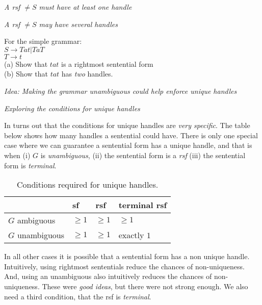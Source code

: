 

\frmrule 

\textit{A rsf $\neq S$ must have at least one handle}




\frmrule 

\textit{A rsf $\neq S$ may have several handles}


\begin{example}
For the simple grammar:\\
$S \rightarrow Tat | TaT$\\
$T \rightarrow t$\\
(a) Show that $tat$ is a rightmost sentential form\\
(b) Show that $tat$ has \textit{two} handles.
\end{example}



\frmrule 

\textit{Idea: Making the grammar unambiguous could help enforce unique handles}

\frmrule 


\textit{Exploring the conditions for unique handles}

In turns out that the conditions for unique handles are \textit{very specific}. 
The table below shows how many handles a sentential could have. There is 
only one special case where we can guarantee a sentential form has a unique
handle, and that is when (i) $G$ is \textit{unambiguous}, 
(ii) the sentential form is a \textit{rsf} (iii) the sentential form is \textit{terminal}.

\begin{table}[h]
    \centering
    \begin{tabular}{l|lll}
                        & sf & rsf  & terminal rsf\\ \hline
    $G$ ambiguous       & $\geqslant 1$ & $\geqslant 1$ & $\geqslant 1$ \\
    $G$ unambiguous     & $\geqslant 1$ & $\geqslant 1$ & exactly $1$ \\
    \end{tabular}
     \caption{Conditions required for unique handles.} 
\end{table}

In all other cases it is possible that a sentential form has a non unique handle. 
Intuitively, using rightmost sententials reduce the chances of non-uniqueness. 
And, using an unambiguous also intuitively reduces the chances of non-uniqueness. 
These were \textit{good ideas}, but there were not strong enough. 
We also need a third condition, that the rsf is \textit{terminal}. 


